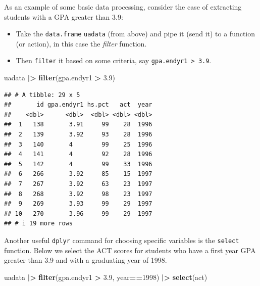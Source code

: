 \documentclass[
]{book}
\newenvironment{Shaded}{\begin{snugshade}}{\end{snugshade}}
\newcommand{\DecValTok}[1]{\textcolor[rgb]{0.00,0.00,0.81}{#1}}
\newcommand{\FloatTok}[1]{\textcolor[rgb]{0.00,0.00,0.81}{#1}}
\newcommand{\FunctionTok}[1]{\textcolor[rgb]{0.13,0.29,0.53}{\textbf{#1}}}
\newcommand{\NormalTok}[1]{#1}
\newcommand{\SpecialCharTok}[1]{\textcolor[rgb]{0.81,0.36,0.00}{\textbf{#1}}}
\providecommand{\tightlist}{%
  \setlength{\itemsep}{0pt}\setlength{\parskip}{0pt}}
\begin{document}
As an example of some basic data processing, consider the case of extracting students with a GPA greater than 3.9:

\begin{itemize}
\tightlist
\item
  Take the \texttt{data.frame} \texttt{uadata} (from above) and pipe it (send it) to a function (or action), in this case the \emph{filter} function.
\item
  Then \texttt{filter} it based on some criteria, say \texttt{gpa.endyr1\ \textgreater{}\ 3.9}.
\end{itemize}

\begin{Shaded}
\begin{Highlighting}[]
\NormalTok{uadata }\SpecialCharTok{|\textgreater{}}
  \FunctionTok{filter}\NormalTok{(gpa.endyr1 }\SpecialCharTok{\textgreater{}} \FloatTok{3.9}\NormalTok{)}
\end{Highlighting}
\end{Shaded}

\begin{verbatim}
## # A tibble: 29 x 5
##       id gpa.endyr1 hs.pct   act  year
##    <dbl>      <dbl>  <dbl> <dbl> <dbl>
##  1   138       3.91     99    28  1996
##  2   139       3.92     93    28  1996
##  3   140       4        99    25  1996
##  4   141       4        92    28  1996
##  5   142       4        99    33  1996
##  6   266       3.92     85    15  1997
##  7   267       3.92     63    23  1997
##  8   268       3.92     98    23  1997
##  9   269       3.93     99    29  1997
## 10   270       3.96     99    29  1997
## # i 19 more rows
\end{verbatim}

Another useful \texttt{dplyr} command for choosing specific variables is the \texttt{select} function. Below we select the ACT scores for students who have a first year GPA greater than 3.9 and with a graduating year of 1998.

\begin{Shaded}
\begin{Highlighting}[]
\NormalTok{uadata }\SpecialCharTok{|\textgreater{}}
  \FunctionTok{filter}\NormalTok{(gpa.endyr1 }\SpecialCharTok{\textgreater{}} \FloatTok{3.9}\NormalTok{, }
\NormalTok{         year}\SpecialCharTok{==}\DecValTok{1998}\NormalTok{) }\SpecialCharTok{|\textgreater{}}
  \FunctionTok{select}\NormalTok{(act)}
\end{Highlighting}
\end{Shaded}
\end{document}
